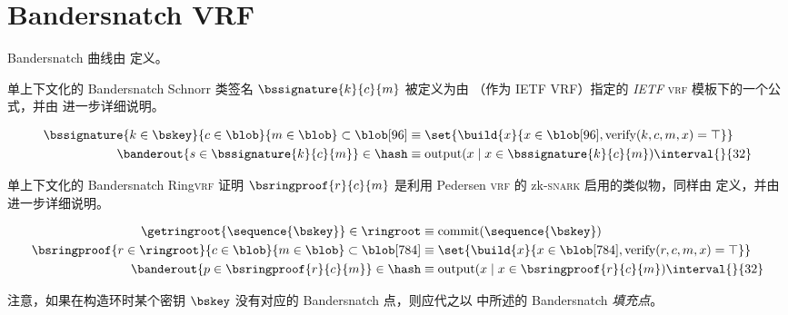 \section{Bandersnatch VRF}\label{sec:bandersnatch}

Bandersnatch 曲线由 \cite{cryptoeprint:2021/1152} 定义。

单上下文化的 Bandersnatch Schnorr 类签名 $\bssignature{k}{c}{m}$ 被定义为由 \cite{hosseini2024bandersnatch}（作为 IETF VRF）指定的 \emph{IETF} \textsc{vrf} 模板下的一个公式，并由 \cite{rfc9381} 进一步详细说明。

\begin{align}
  \bssignature{k \in \bskey}{c \in \blob}{m \in \blob} \subset \blob[96] &\equiv \set{\build{x}{x \in \blob[96], \text{verify}(k, c, m, x) = \top }}  \\
  \banderout{s \in \bssignature{k}{c}{m}} \in \hash &\equiv \text{output}(x \mid x \in \bssignature{k}{c}{m})\interval{}{32}
\end{align}

单上下文化的 Bandersnatch Ring\textsc{vrf} 证明 $\bsringproof{r}{c}{m}$ 是利用 Pedersen \textsc{vrf} 的 zk-\textsc{snark} 启用的类似物，同样由 \cite{hosseini2024bandersnatch} 定义，并由 \cite{cryptoeprint:2023/002} 进一步详细说明。

\begin{align}
  \getringroot{\sequence{\bskey}} \in \ringroot &\equiv \text{commit}(\sequence{\bskey})  \\
  \bsringproof{r \in \ringroot}{c \in \blob}{m \in \blob} \subset \blob[784] &\equiv \set{\build{x}{x \in \blob[784], \text{verify}(r, c, m, x) = \top }}  \\
  \banderout{p \in \bsringproof{r}{c}{m}} \in \hash &\equiv \text{output}(x \mid x \in \bsringproof{r}{c}{m})\interval{}{32}
\end{align}

注意，如果在构造环时某个密钥 $\bskey$ 没有对应的 Bandersnatch 点，则应代之以 \cite{hosseini2024bandersnatch} 中所述的 Bandersnatch \emph{填充点}。
